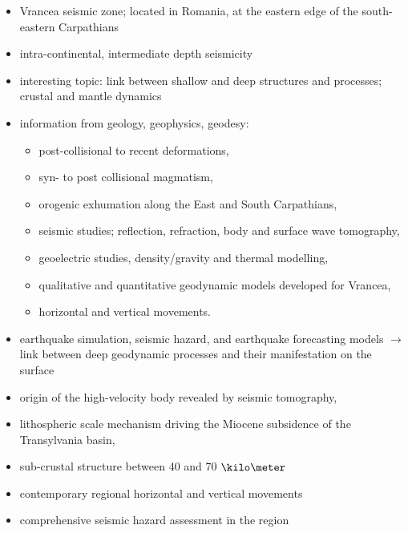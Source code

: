 \documentclass{beamer}
\begin{document}
\begin{frame}{\ft}
    \begin{itemize}
        \item Vrancea seismic zone; located in Romania, at the eastern edge
        of the south-eastern Carpathians
        \item intra-continental, intermediate depth seismicity
        \item interesting topic: link between shallow and deep structures and
            processes; crustal and mantle dynamics
        \item information from geology, geophysics, geodesy:
        
        \pause
        
        \begin{itemize}
            \item post-collisional to recent deformations,
            \item syn- to post collisional magmatism,
            \item orogenic exhumation along the East and South Carpathians,
            \item seismic studies; reflection, refraction, body and surface wave
            tomography,
            \item geoelectric studies, density/gravity and thermal modelling,
            \item qualitative and quantitative geodynamic models developed for Vrancea,
            \item horizontal and vertical movements.
        \end{itemize}
    
    \pause
    
    \item earthquake simulation, seismic hazard, and earthquake forecasting
    models $\rightarrow$ link between deep geodynamic processes and their
    manifestation on the surface
    
    \end{itemize}
\end{frame}

\begin{frame}{\ft}
    \begin{itemize}
        \item origin of the high-velocity body revealed by seismic tomography,
        \item lithospheric scale mechanism driving the Miocene subsidence
        of the Transylvania basin,
        \item sub-crustal structure between 40 and 70 \(\kilo\meter\)
        \item contemporary regional horizontal and vertical movements
        \item comprehensive seismic hazard assessment in the region

    \end{itemize}
\end{frame}
\end{document}
